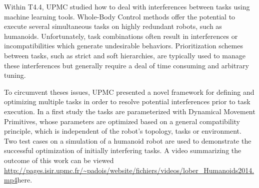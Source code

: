 

Within T4.4, UPMC studied how to deal with interferences between tasks using
machine learning tools. Whole-Body Control methods offer the potential to
execute several simultaneous tasks on highly redundant robots, such as
humanoids. Unfortunately, task combinations often result in interferences or
incompatibilities which generate undesirable behaviors. Prioritization schemes
between tasks, such as strict and soft hierarchies, are typically used to manage
these interferences but generally require a deal of time consuming and arbitrary
tuning.

To circumvent theses issues, UPMC presented a novel framework for defining and
optimizing multiple tasks in order to resolve potential interferences prior to
task execution. In a first study \cite{lober-HUMANOIDS2014} the tasks are
parameterized with Dynamical Movement Primitives, whose parameters are optimized
based on a general compatibility principle, which is independent of the robot’s
topology, tasks or environment. Two test cases on a simulation of a humanoid
robot are used to demonstrate the successful optimization of initially
interfering tasks. A video summarizing the outcome of this work can be viewed
\url{http://pages.isir.upmc.fr/~padois/website/fichiers/videos/lober_Humanoids2014.mp4}{here}.

